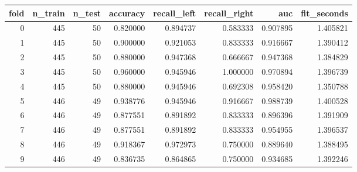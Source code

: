 \begin{tabular}{rrrrrrrr}
\toprule
fold & n_train & n_test & accuracy & recall_left & recall_right & auc & fit_seconds \\
\midrule
0 & 445 & 50 & 0.820000 & 0.894737 & 0.583333 & 0.907895 & 1.405821 \\
1 & 445 & 50 & 0.900000 & 0.921053 & 0.833333 & 0.916667 & 1.390412 \\
2 & 445 & 50 & 0.880000 & 0.947368 & 0.666667 & 0.947368 & 1.384829 \\
3 & 445 & 50 & 0.960000 & 0.945946 & 1.000000 & 0.970894 & 1.396739 \\
4 & 445 & 50 & 0.880000 & 0.945946 & 0.692308 & 0.958420 & 1.350788 \\
5 & 446 & 49 & 0.938776 & 0.945946 & 0.916667 & 0.988739 & 1.400528 \\
6 & 446 & 49 & 0.877551 & 0.891892 & 0.833333 & 0.896396 & 1.391909 \\
7 & 446 & 49 & 0.877551 & 0.891892 & 0.833333 & 0.954955 & 1.396537 \\
8 & 446 & 49 & 0.918367 & 0.972973 & 0.750000 & 0.889640 & 1.388495 \\
9 & 446 & 49 & 0.836735 & 0.864865 & 0.750000 & 0.934685 & 1.392246 \\
\bottomrule
\end{tabular}
